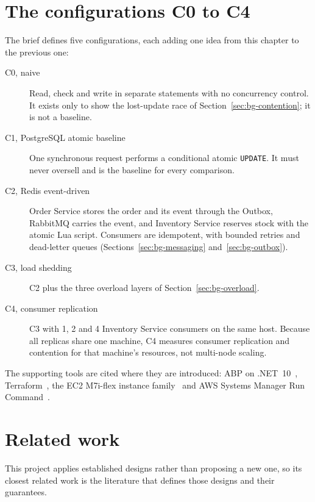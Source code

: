 \documentclass[a4paper]{report}
\begin{document}
\section{The configurations C0 to C4}
\label{sec:bg-configs}

The brief defines five configurations, each adding one idea from this chapter
to the previous one:
\begin{description}
  \item[C0, naive] Read, check and write in separate statements with no
    concurrency control. It exists only to show the lost-update race of
    Section~\ref{sec:bg-contention}; it is not a baseline.
  \item[C1, PostgreSQL atomic baseline] One synchronous request performs a
    conditional atomic \texttt{UPDATE}. It must never oversell and is the
    baseline for every comparison.
  \item[C2, Redis event-driven] Order Service stores the order and its event
    through the Outbox, RabbitMQ carries the event, and Inventory Service
    reserves stock with the atomic Lua script. Consumers are idempotent, with
    bounded retries and dead-letter queues (Sections~\ref{sec:bg-messaging}
    and~\ref{sec:bg-outbox}).
  \item[C3, load shedding] C2 plus the three overload layers of
    Section~\ref{sec:bg-overload}.
  \item[C4, consumer replication] C3 with 1, 2 and 4 Inventory Service
    consumers on the same host. Because all replicas share one machine, C4
    measures consumer replication and contention for that machine's
    resources, not multi-node scaling.
\end{description}

The supporting tools are cited where they are introduced: ABP on
.NET~10~\cite{abp-docs,dotnet10}, Terraform~\cite{terraform}, the EC2
M7i-flex instance family~\cite{aws-m7i} and AWS Systems Manager Run
Command~\cite{aws-run-command}.

\section{Related work}
\label{sec:related-work}

This project applies established designs rather than proposing a new one, so
its closest related work is the literature that defines those designs and
their guarantees.
\end{document}

